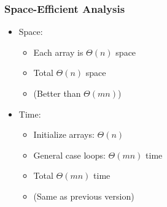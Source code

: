 \documentclass{beamer}
\begin{document}
\begin{frame} \frametitle{Space-Efficient Analysis}
  \begin{itemize}
  \item Space:
    \begin{itemize}
    \item Each array is $\Theta(n)$ space
    \item Total $\Theta(n)$ space
    \item (Better than $\Theta(mn)$)
    \end{itemize}
  \item Time:
    \begin{itemize}
    \item Initialize arrays: $\Theta(n)$
    \item General case loops: $\Theta(mn)$ time
    \item Total $\Theta(mn)$ time
    \item (Same as previous version)
    \end{itemize}
  \end{itemize}
\end{frame}
\end{document}
